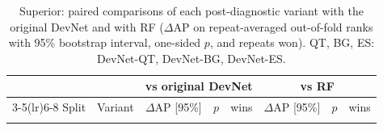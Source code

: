 \documentclass[pdflatex,sn-apa]{sn-jnl}
\begin{document}
\begin{appendices}
\begin{table}[!h]
\caption{Superior: paired comparisons of each post-diagnostic variant with the original DevNet and with RF ($\Delta$AP on repeat-averaged out-of-fold ranks with 95\% bootstrap interval, one-sided $p$, and repeats won). QT, BG, ES: DevNet-QT, DevNet-BG, DevNet-ES.}\label{tab:sensitivity-sup}
\scriptsize
\setlength{\tabcolsep}{2.5pt}
\begin{tabular*}{\textwidth}{@{\extracolsep\fill}llcccccc}
\toprule
 & & \multicolumn{3}{c}{vs original DevNet} & \multicolumn{3}{c}{vs RF} \\
\cmidrule(lr){3-5}\cmidrule(lr){6-8}
Split & Variant & $\Delta$AP [95\%] & $p$ & wins & $\Delta$AP [95\%] & $p$ & wins \\
\midrule
\botrule
\end{tabular*}
\end{table}

\end{appendices}

\clearpage


\end{document}
